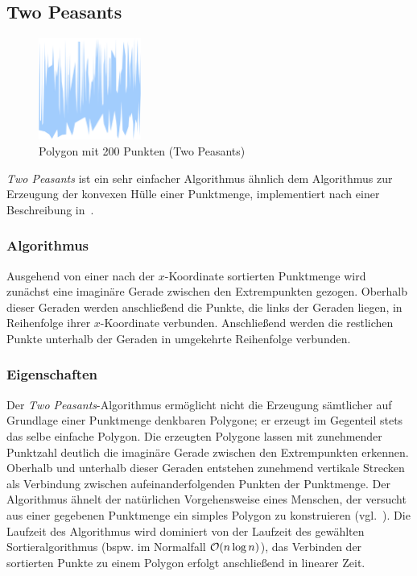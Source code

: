 \subsection{Two Peasants}

\begin{figure}[h]
\begin{center}
\includegraphics[width=0.3\textwidth]{img/twopeasants200.eps}
\end{center}
\caption{Polygon mit 200 Punkten (Two Peasants)}
\label{fig:twopeasants200}
\end{figure}

\emph{Two Peasants} ist ein sehr einfacher Algorithmus ähnlich dem Algorithmus zur Erzeugung der konvexen Hülle einer Punktmenge, implementiert nach einer Beschreibung in~\cite{geometrylab}. 

\subsubsection{Algorithmus}
Ausgehend von einer nach der $x$-Koordinate sortierten Punktmenge wird zunächst eine imaginäre Gerade zwischen den Extrempunkten gezogen. Oberhalb dieser Geraden werden anschließend die Punkte, die links der Geraden liegen, in Reihenfolge ihrer $x$-Koordinate verbunden. Anschließend werden die restlichen Punkte unterhalb der Geraden in umgekehrte Reihenfolge verbunden.

\subsubsection{Eigenschaften}
Der \emph{Two Peasants}-Algorithmus ermöglicht nicht die Erzeugung sämtlicher auf Grundlage einer Punktmenge denkbaren Polygone; er erzeugt im Gegenteil stets das selbe einfache Polygon. Die erzeugten Polygone lassen mit zunehmender Punktzahl deutlich die imaginäre Gerade zwischen den Extrempunkten erkennen. Oberhalb und unterhalb dieser Geraden entstehen zunehmend vertikale Strecken als Verbindung zwischen aufeinanderfolgenden Punkten der Punktmenge. Der Algorithmus ähnelt der natürlichen Vorgehensweise eines Menschen, der versucht aus einer gegebenen Punktmenge ein simples Polygon zu konstruieren (vgl.~\cite{geometrylab}). Die Laufzeit des Algorithmus wird dominiert von der Laufzeit des gewählten Sortieralgorithmus (bspw. im Normalfall $\mathcal{O}(n \log n)$), das Verbinden der sortierten Punkte zu einem Polygon erfolgt anschließend in linearer Zeit.
